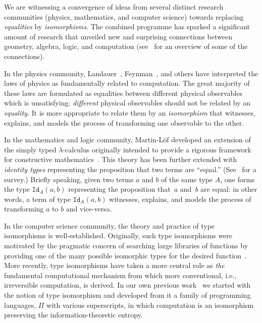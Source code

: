 \documentclass[11pt]{article}
\begin{document}
We are witnessing a convergence of ideas from several distinct research
communities (physics, mathematics, and computer science) towards replacing
\emph{equalities} by \emph{isomorphisms}. The combined programme has sparked
a significant amount of research that unveiled new and surprising connections
between geometry, algebra, logic, and computation (see~\cite{baez2011physics}
for an overview of some of the connections).

In the physics community, Landauer~\cite{Landauer:1961,Landauer},
Feynman~\cite{springerlink:10.1007/BF02650179}, and others have interpreted
the laws of physics as fundamentally related to computation. The great
majority of these laws are formulated as equalities between different
physical observables which is unsatisfying: \emph{different} physical
observables should not be related by an \emph{equality}. It is more
appropriate to relate them by an \emph{isomorphism} that witnesses, explains,
and models the process of transforming one observable to the other.

In the mathematics and logic community, Martin-L\"of developed an extension
of the simply typed $\lambda$-calculus originally intended to provide a
rigorous framework for constructive
mathematics~\cite{citeulike:7374951}. This theory has been further extended
with \emph{identity types} representing the proposition that two terms are
``equal.'' (See~\cite{streicher,warren} for a survey.) Briefly speaking,
given two terms $a$ and $b$ of the same type $A$, one forms the type
$\texttt{Id}_A(a,b)$ representing the proposition that~$a$ and~$b$ are equal:
in other words, a term of type $\texttt{Id}_A(a,b)$ witnesses, explains, and
models the process of transforming $a$ to $b$ and vice-versa.

In the computer science community, the theory and practice of type
isomorphisms is well-established. Originally, such type isomorphisms were
motivated by the pragmatic concern of searching large libraries of functions
by providing one of the many possible isomorphic types for the desired
function~\cite{Rittri:1989:UTS:99370.99384}. More recently, type isomorphisms
have taken a more central role as \emph{the} fundamental computational
mechanism from which more conventional, i.e., irreversible computation, is
derived. In our own previous
work~\cite{James:2012:IE:2103656.2103667,rc2011,rc2012} we started with the
notion of type isomorphism and developed from it a family of programming
languages, $\Pi$ with various superscripts, in which computation is an
isomorphism preserving the information-theoretic entropy.
\end{document}
